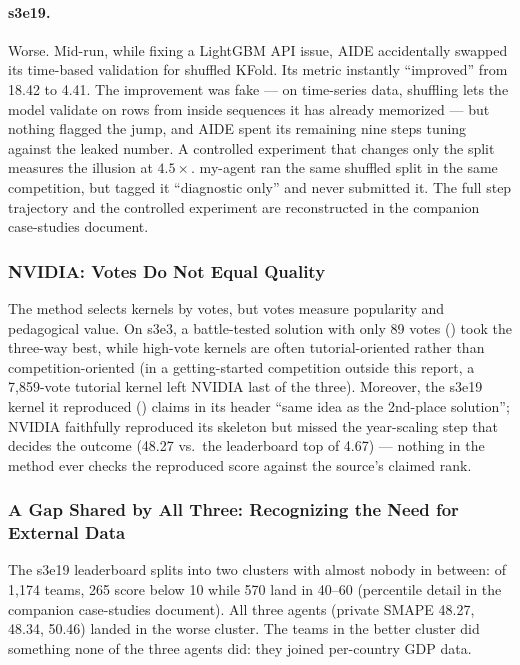 \documentclass[11pt,a4paper]{article}
\begin{document}
\paragraph{s3e19.} Worse. Mid-run, while fixing a LightGBM API issue, AIDE accidentally swapped its time-based validation for shuffled KFold. Its metric instantly ``improved'' from 18.42 to 4.41. The improvement was fake --- on time-series data, shuffling lets the model validate on rows from inside sequences it has already memorized --- but nothing flagged the jump, and AIDE spent its remaining nine steps tuning against the leaked number. A controlled experiment that changes only the split measures the illusion at $4.5\times$. my-agent ran the same shuffled split in the same competition, but tagged it ``diagnostic only'' and never submitted it. The full step trajectory and the controlled experiment are reconstructed in the companion case-studies document.

\subsubsection{NVIDIA: Votes Do Not Equal Quality}
\label{sec:votes}

The method selects kernels by votes, but votes measure popularity and pedagogical value. On s3e3, a battle-tested solution with only 89 votes () took the three-way best, while high-vote kernels are often tutorial-oriented rather than competition-oriented (in a getting-started competition outside this report, a 7{,}859-vote tutorial kernel left NVIDIA last of the three). Moreover, the s3e19 kernel it reproduced () claims in its header ``same idea as the 2nd-place solution''; NVIDIA faithfully reproduced its skeleton but missed the year-scaling step that decides the outcome (48.27 vs.\ the leaderboard top of 4.67) --- nothing in the method ever checks the reproduced score against the source's claimed rank.

\subsubsection{A Gap Shared by All Three: Recognizing the Need for External Data}
\label{sec:external}

The s3e19 leaderboard splits into two clusters with almost nobody in between: of 1{,}174 teams, 265 score below 10 while 570 land in 40--60 (percentile detail in the companion case-studies document). All three agents (private SMAPE 48.27, 48.34, 50.46) landed in the worse cluster. The teams in the better cluster did something none of the three agents did: they joined per-country GDP data.
\end{document}
